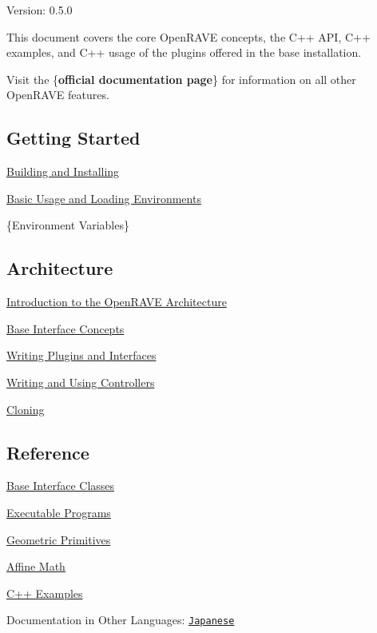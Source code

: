 Version: 0.5.0

This document covers the core OpenRAVE concepts, the C++ API, C++ examples, and C++ usage of the plugins offered in the base installation.

Visit the \{{\bfseries official documentation page}\} for information on all other OpenRAVE features.\hypertarget{index_main_started}{}\subsection{Getting Started}\label{index_main_started}

\begin{DoxyItemize}
\item \hyperlink{installation}{Building and Installing}
\item \hyperlink{p__basic__usage}{Basic Usage and Loading Environments}
\item \{Environment Variables\}
\end{DoxyItemize}\hypertarget{index_main_architecture}{}\subsection{Architecture}\label{index_main_architecture}

\begin{DoxyItemize}
\item \hyperlink{architecture__concepts}{Introduction to the OpenRAVE Architecture}
\item \hyperlink{interface__concepts}{Base Interface Concepts}
\item \hyperlink{writing__plugins}{Writing Plugins and Interfaces}
\item \hyperlink{arch__controller_arch_controller_writing}{Writing and Using Controllers}
\item \hyperlink{architecture__concepts_arch_cloning}{Cloning}
\end{DoxyItemize}\hypertarget{index_main_reference}{}\subsection{Reference}\label{index_main_reference}

\begin{DoxyItemize}
\item \hyperlink{group__interfaces}{Base Interface Classes}
\item \hyperlink{executables}{Executable Programs}
\item \hyperlink{group__geometric__primitives}{Geometric Primitives}
\item \hyperlink{group__affine__math}{Affine Math}
\item \hyperlink{cpp__examples}{C++ Examples}
\end{DoxyItemize}

Documentation in Other Languages: \href{http://openrave.org/ordocs/ja/html/index.html}{\tt Japanese} 